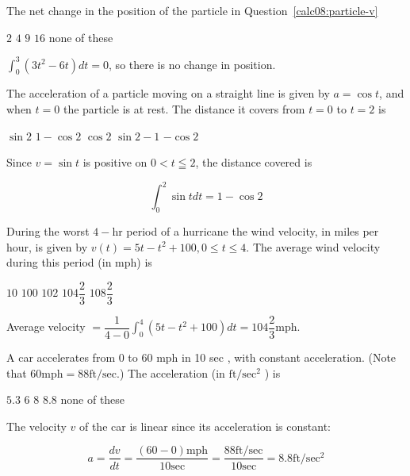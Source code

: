 \newpage



\question
The net change in the position of the particle in Question~\ref{calc08:particle-v}
\begin{choices}
  \choice $2$
  \choice $4$
  \choice $9$
  \choice $16$
  \CorrectChoice none of these
\end{choices}
\begin{solution}
$\int_{0}^{3}\left(3 t^{2}-6 t\right) d t=0$, so there is no change in position.
\end{solution}

\question
The acceleration of a particle moving on a straight line is given by $a=\cos t$, and when $t=0$ the particle is at rest. The distance it covers from $t=0$ to $t=2$ is
\begin{choices}
  \choice $\sin 2$
  \CorrectChoice $1-\cos 2$
  \choice $\cos 2$
  \choice $\sin 2-1$
  \choice $-\cos 2$
\end{choices}
\begin{solution}
Since $v=\sin t$ is positive on $0<t \leqq 2$, the distance covered is


\[
\int_{0}^{2} \sin t d t=1-\cos 2
\]


\end{solution}

\question
During the worst $4-\mathrm{hr}$ period of a hurricane the wind velocity, in miles per hour, is given by $v(t)=5 t-t^{2}+100,0 \leqslant t \leqslant 4$. The average wind velocity during this period (in mph) is
\begin{choices}
  \choice $10$
  \choice $100$
  \choice $102$
  \CorrectChoice $104 \dfrac{2}{3}$
  \choice $108 \dfrac{2}{3}$
\end{choices}
\begin{solution}
Average velocity $=\dfrac{1}{4-0} \int_{0}^{4}\left(5 t-t^{2}+100\right) d t=104 \dfrac{2}{3} \mathrm{mph}$.
\end{solution}






\newpage



\question
A car accelerates from 0 to 60 mph in 10 sec , with constant acceleration. (Note that $60 \mathrm{mph}=88 \mathrm{ft} / \mathrm{sec}$.) The acceleration (in $\mathrm{ft} / \mathrm{sec}^{2}$ ) is
\begin{choices}
  \choice $5.3$
  \choice $6$
  \choice $8$
  \CorrectChoice $8.8$
  \choice none of these
\end{choices}
\begin{solution}
The velocity $v$ of the car is linear since its acceleration is constant:


\[
a=\dfrac{d v}{d t}=\dfrac{(60-0) \mathrm{mph}}{10 \mathrm{sec}}=\dfrac{88 \mathrm{ft} / \mathrm{sec}}{10 \mathrm{sec}}=8.8 \mathrm{ft} / \mathrm{sec}^{2}
\]


\end{solution}


